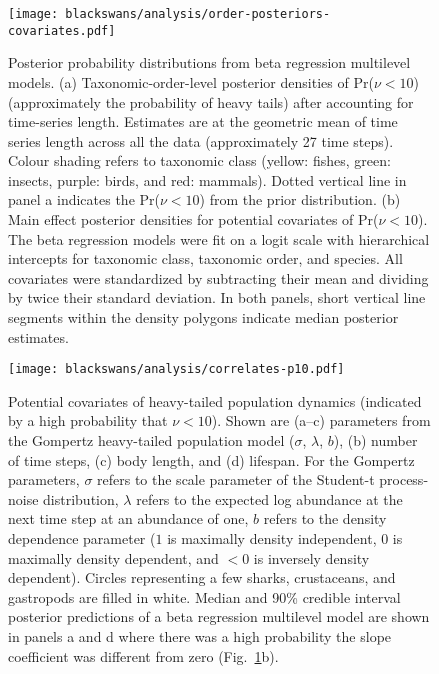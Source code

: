 \begin{figure}[htbp]
\begin{center}
\texttt{[image: blackswans/analysis/order-posteriors-covariates.pdf]}

\caption[Posterior probability distributions from beta regression multilevel
  models.]{Posterior probability distributions from beta regression multilevel
  models. (a) Taxonomic-order-level posterior densities of Pr($\nu < 10$)
  (approximately the probability of heavy tails) after accounting for
  time-series length. Estimates are at the geometric mean of time series
  length across all the data (approximately 27 time steps). Colour shading
  refers to taxonomic class (yellow: fishes, green: insects, purple: birds,
  and red: mammals). Dotted vertical line in panel a indicates the
  Pr($\nu < 10$) from the prior distribution. (b) Main effect
  posterior densities for potential covariates of Pr($\nu < 10$). The beta
  regression models were fit on a logit scale with hierarchical intercepts for
  taxonomic class, taxonomic order, and species. All covariates were
  standardized by subtracting their mean and dividing by twice their standard
  deviation. In both panels, short vertical line segments within the density
  polygons indicate median posterior estimates.}

\label{fig:posteriors}
\end{center}
\end{figure}

\begin{figure}[htbp]
\begin{center}
\texttt{[image: blackswans/analysis/correlates-p10.pdf]}

\caption[Potential covariates of heavy-tailed population dynamics.]{Potential covariates of heavy-tailed population dynamics (indicated
  by a high probability that $\nu < 10$). Shown are (a--c) parameters from the
  Gompertz heavy-tailed population model ($\sigma$, $\lambda$, $b$), (b)
  number of time steps, (c) body length, and (d) lifespan. For the Gompertz
  parameters, $\sigma$ refers to the scale parameter of the Student-t
  process-noise distribution, $\lambda$ refers to the expected log abundance
  at the next time step at an abundance of one, $b$ refers to the density
  dependence parameter ($1$ is maximally density independent, $0$ is maximally
  density dependent, and $<0$ is inversely density dependent). Circles
  representing a few sharks, crustaceans, and gastropods are filled in white.
  Median and 90\% credible interval posterior predictions of a beta regression
  multilevel model are shown in panels a and d where there was a high
  probability the slope coefficient was different from zero
  (Fig.~\ref{fig:posteriors}b).}

\label{fig:correlates}
\end{center}
\end{figure}

\clearpage

